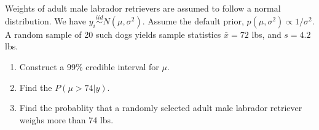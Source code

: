   \item 
 Weights of adult male labrador retrievers are assumed to follow a normal distribution. We have $y_i\stackrel{iid}{\sim}N(\mu, \sigma^2)$. Assume the default prior, $p(\mu, \sigma^2)\propto 1/\sigma^2$. A random sample of 20 such dogs yields sample statistics $\bar{x}=72$ lbs, and $s=4.2$ lbs. 
 
     
    \begin{enumerate}
      \item Construct a 99\% credible interval for $\mu$. 
      \item Find the $P(\mu>74|y)$. 
      \item Find the probablity that a randomly selected adult male labrador retriever weighs more than 74 lbs. 
\end{enumerate}

